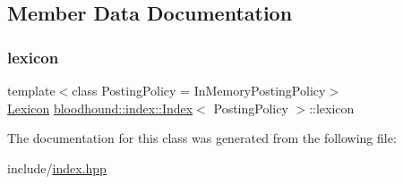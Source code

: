 \subsection{Member Data Documentation}
\mbox{\label{classbloodhound_1_1index_1_1Index_a746d80c2fb411f512726c8d37cad78fc}} 
\subsubsection{\texorpdfstring{lexicon}{lexicon}}
{\footnotesize\ttfamily template$<$class Posting\+Policy = In\+Memory\+Posting\+Policy$>$ \\
\mbox{\hyperlink{namespacebloodhound_a94032a3533df0a1b6d3435bad57e6499}{Lexicon}} \mbox{\hyperlink{classbloodhound_1_1index_1_1Index}{bloodhound\+::index\+::\+Index}}$<$ Posting\+Policy $>$\+::lexicon}



The documentation for this class was generated from the following file\+:\begin{DoxyCompactItemize}
\item 
include/\mbox{\hyperlink{index_8hpp}{index.\+hpp}}\end{DoxyCompactItemize}
